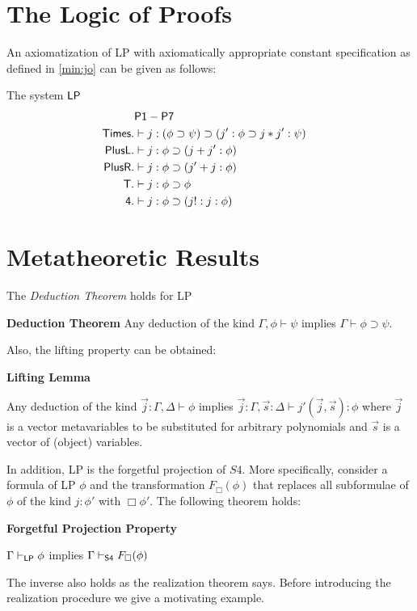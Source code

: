 \section{The Logic of Proofs}
An axiomatization of \ac{LP} with axiomatically appropriate constant specification as defined in \ref{min:jo} can be given
as follows:
	\begin{mdframed}
	The system $\sf{LP}$ 
	\begin{align*}
	& \sf{P1-P7}\\
	 \sf{Times}.& \vdash j:(\phi\supset\psi)\supset(j':\phi\supset j*j':\psi)&\\
	  \sf{PlusL}.& \vdash j:\phi\supset(j+j':\phi)&\\
	  \sf{PlusR}.& \vdash j:\phi\supset(j'+j:\phi)&\\
	 \sf{T}.& \vdash j:\phi\supset\phi\\
	\sf{4}. &\vdash j:\phi\supset (j!:j:\phi)
		\end{align*}
	
   \end{mdframed}
\section{Metatheoretic Results}
The \emph{Deduction Theorem} holds for \ac{LP}
\begin{mdframed}
\textbf{Deduction Theorem}
Any deduction of the kind $\Gamma,\phi\vdash\psi$ implies $\Gamma\vdash \phi\supset\psi$.
\end{mdframed}
Also, the lifting property can be obtained:
\begin{mdframed}
\textbf{Lifting Lemma}

Any deduction of the kind $\vec{j}:\Gamma,\Delta\vdash\phi$ implies $\vec{j}:\Gamma,\vec{s}:\Delta\vdash j'(\vec{j},\vec{s}):\phi$ where $\vec{j}$ is a vector metavariables to be substituted for arbitrary polynomials and $\vec{s}$ is a vector of (object) variables. 

\end{mdframed}
In addition, \ac{LP} is the forgetful projection of {\sf $S4$}. 
More specifically, consider a formula of \ac{LP} $\phi$ and the transformation $F_\Box(\phi)$ that replaces all subformulae of $\phi$ of the kind $j:\phi'$ with $\Box\phi'$. The following theorem holds:
\begin{mdframed}
\textbf{Forgetful Projection Property}

$\Gamma\vdash_{\sf LP}\phi$ implies $\Gamma\vdash_{\sf{ S4}}F_{\Box}(\phi)$ 

\end{mdframed}
  The inverse also holds as the realization theorem says. Before introducing the realization procedure we give a motivating example.
  

